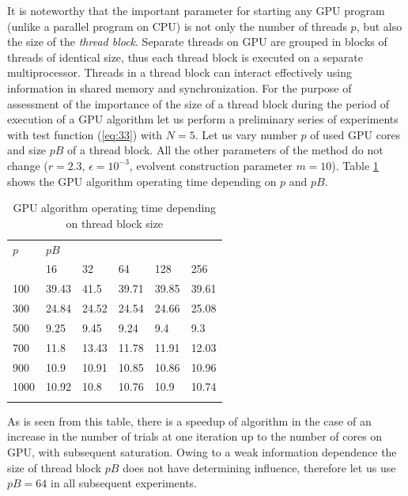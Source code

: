 \documentclass[smallcondensed]{svjour3}     %
\begin{document}
It is noteworthy that the important parameter for starting any GPU program (unlike a parallel program on CPU) is not only the number of threads $p$, but also the size of the \textit{thread block}. Separate threads on GPU are grouped in blocks of threads of identical size, thus each thread block is executed on a separate multiprocessor. Threads in a thread block can interact effectively using information in shared memory and synchronization. For the purpose of assessment of the importance of the size of a thread block during the period of execution of a GPU algorithm let us perform a preliminary series of experiments with test function (\ref{eq:33}) with $N=5$. Let us vary number $p$ of used GPU cores and size $pB$ of a thread block. All the other parameters of the method do not change ($r=2.3$, $\epsilon = 10^{-3}$, evolvent construction parameter $m=10$). Table \ref{tab:2} shows the GPU algorithm operating time depending on $p$ and $pB$.
\begin{table}
	\caption{GPU algorithm operating time depending on thread block size}
	\label{tab:2}
	\center
	\begin{tabular}{llllll}
		\hline\noalign{\smallskip}
		$p$ & \multicolumn{5}{l}{ \hfil $pB$ \hfil } \\
		\noalign{\smallskip} \cline{2-6} \noalign{\smallskip}
		 & 16 & 32 & 64 & 128 & 256  \\
		\noalign{\smallskip} \hline \noalign{\smallskip}
		100 &	39.43 &	41.5 &	39.71 &	39.85 &	39.61 \\
		300 &	24.84 &	24.52 &	24.54 &	24.66 &	25.08 \\
		500 &	9.25 &	9.45 &	9.24 &	9.4 &	9.3\\
		700 &	11.8 &	13.43 &	11.78 &	11.91 &	12.03\\
		900 &	10.9 &	10.91 &	10.85 &	10.86 &	10.96\\
		1000 &	10.92 &	10.8 &	10.76 &	10.9 &	10.74\\
		\noalign{\smallskip}\hline
	\end{tabular}
\end{table}

As is seen from this table, there is a speedup of algorithm in the case of an increase in the number of trials at one iteration up to the number of cores on GPU, with subsequent saturation. Owing to a weak information dependence the size of thread block $pB$ does not have determining influence, therefore let us use $pB=64$ in all subsequent experiments.
\end{document}
